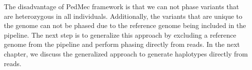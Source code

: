 The disadvantage of PedMec framework is that we can not phase variants that are heterozygous in all individuals.
Additionally, the variants that are unique to the genome can not be phased due to the reference genome being included in the pipeline.
The next step is to generalize this approach by excluding a reference genome from the pipeline and perform phasing directly from reads.
In the next chapter, we discuss the generalized approach to generate haplotypes directly from reads.

% 






